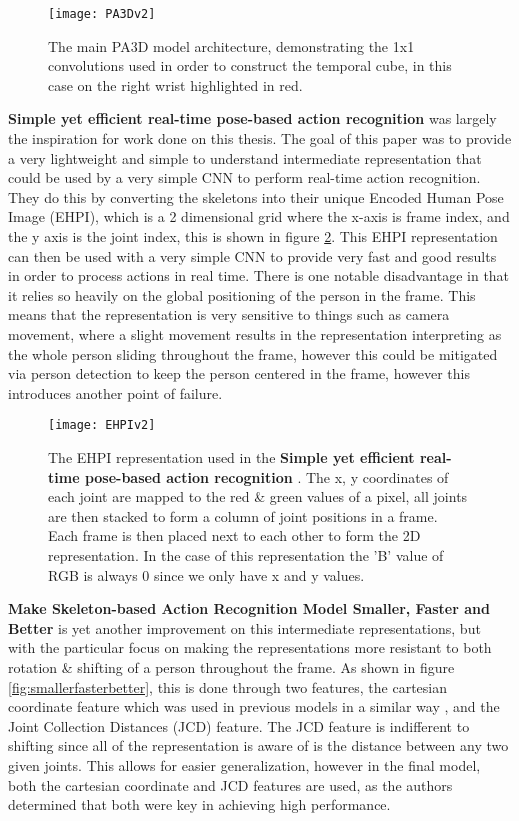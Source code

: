\begin{figure}[ht]
	\texttt{[image: PA3Dv2]}
	\centering
	\caption{The main PA3D \cite{PA3D} model architecture, demonstrating the 1x1 convolutions used in order to construct the temporal cube, in this case on the right wrist highlighted in red.}
	\label{fig:PA3D}
\end{figure}

\textbf{Simple yet efficient real-time pose-based action recognition} \cite{simple_yet_efficient} was largely the inspiration for work done on this thesis. The goal of this paper was to provide a very lightweight and simple to understand intermediate representation that could be used by a very simple CNN to perform real-time action recognition. They do this by converting the skeletons into their unique Encoded Human Pose Image (EHPI), which is a 2 dimensional grid where the x-axis is frame index, and the y axis is the joint index, this is shown in figure \ref{fig:EHPI}. This EHPI representation can then be used with a very simple CNN to provide very fast and good results in order to process actions in real time. There is one notable disadvantage in that it relies so heavily on the global positioning of the person in the frame. This means that the representation is very sensitive to things such as camera movement, where a slight movement results in the representation interpreting as the whole person sliding throughout the frame, however this could be mitigated via person detection to keep the person centered in the frame, however this introduces another point of failure.

\begin{figure}[ht]
	\texttt{[image: EHPIv2]}
	\centering
	\caption{The EHPI representation used in the \textbf{Simple yet efficient real-time pose-based action recognition} \cite{simple_yet_efficient}. The x, y coordinates of each joint are mapped to the red \& green values of a pixel, all joints are then stacked to form a column of joint positions in a frame. Each frame is then placed next to each other to form the 2D representation. In the case of this representation the 'B' value of RGB is always 0 since we only have x and y values.}
	\label{fig:EHPI}
\end{figure}

\textbf{Make Skeleton-based Action Recognition Model Smaller, Faster and Better} \cite{smaller_faster_better} is yet another improvement on this intermediate representations, but with the particular focus on making the representations more resistant to both rotation \& shifting of a person throughout the frame.  As shown in figure \ref{fig:smallerfasterbetter}, this is done through two features, the cartesian coordinate feature which was used in previous models in a similar way \cite{simple_yet_efficient}, and the Joint Collection Distances (JCD) feature. The JCD feature is indifferent to shifting since all of the representation is aware of is the distance between any two given joints. This allows for easier generalization, however in the final model, both the cartesian coordinate and JCD features are used, as the authors determined that both were key in achieving high performance.

